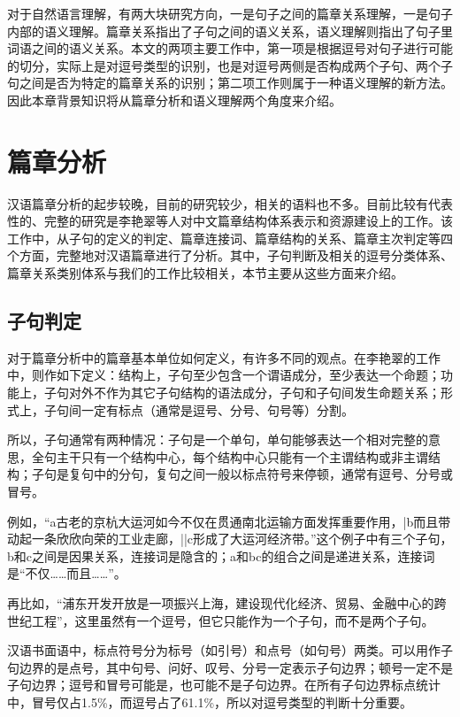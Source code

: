 \documentclass[master, winfont]{njuthesis}
\begin{document}

对于自然语言理解，有两大块研究方向，一是句子之间的篇章关系理解，一是句子内部的语义理解。篇章关系指出了子句之间的语义关系，语义理解则指出了句子里词语之间的语义关系。本文的两项主要工作中，第一项是根据逗号对句子进行可能的切分，实际上是对逗号类型的识别，也是对逗号两侧是否构成两个子句、两个子句之间是否为特定的篇章关系的识别；第二项工作则属于一种语义理解的新方法。因此本章背景知识将从篇章分析和语义理解两个角度来介绍。

\section{篇章分析}
汉语篇章分析的起步较晚，目前的研究较少，相关的语料也不多。目前比较有代表性的、完整的研究是李艳翠等人\cite{liyancui2015}对中文篇章结构体系表示和资源建设上的工作。该工作中，从子句的定义的判定、篇章连接词、篇章结构的关系、篇章主次判定等四个方面，完整地对汉语篇章进行了分析。其中，子句判断及相关的逗号分类体系、篇章关系类别体系与我们的工作比较相关，本节主要从这些方面来介绍。

\subsection{子句判定}
对于篇章分析中的篇章基本单位如何定义，有许多不同的观点。在李艳翠的工作中，则作如下定义：结构上，子句至少包含一个谓语成分，至少表达一个命题；功能上，子句对外不作为其它子句结构的语法成分，子句和子句间发生命题关系；形式上，子句间一定有标点（通常是逗号、分号、句号等）分割。

所以，子句通常有两种情况：子句是一个单句，单句能够表达一个相对完整的意思，全句主干只有一个结构中心，每个结构中心只能有一个主谓结构或非主谓结构；子句是复句中的分句，复句之间一般以标点符号来停顿，通常有逗号、分号或冒号。

例如，“a古老的京杭大运河如今不仅在贯通南北运输方面发挥重要作用，|b而且带动起一条欣欣向荣的工业走廊，||c形成了大运河经济带。”这个例子中有三个子句，b和c之间是因果关系，连接词是隐含的；a和bc的组合之间是递进关系，连接词是“不仅……而且……”。

再比如，“浦东开发开放是一项振兴上海，建设现代化经济、贸易、金融中心的跨世纪工程”，这里虽然有一个逗号，但它只能作为一个子句，而不是两个子句。

汉语书面语中，标点符号分为标号（如引号）和点号（如句号）两类。可以用作子句边界的是点号，其中句号、问好、叹号、分号一定表示子句边界；顿号一定不是子句边界；逗号和冒号可能是，也可能不是子句边界。在所有子句边界标点统计中，冒号仅占1.5\%，而逗号占了61.1\%，所以对逗号类型的判断十分重要。
\end{document}
